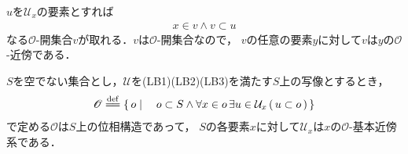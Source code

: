 \begin{description}
			\begin{sketch}
				$u$を$\mathcal{U}_{x}$の要素とすれば
				\begin{align}
					x \in v \wedge v \subset u
				\end{align}
				なる$\mathscr{O}$-開集合$v$が取れる．$v$は$\mathscr{O}$-開集合なので，
				$v$の任意の要素$y$に対して$v$は$y$の$\mathscr{O}$-近傍である．
				\QED
			\end{sketch}
	\end{description}
	
	\begin{screen}
		\begin{thm}[与えられたシステムを基本近傍系とする位相の生成]
		\label{thm:a_local_base_restores_the_topology}
			$S$を空でない集合とし，$\mathcal{U}$を(LB1)(LB2)(LB3)を満たす$S$上の写像とするとき，
			\begin{align}
				\mathscr{O} \defeq
				\Set{o}{o \subset S \wedge \forall x \in o\, \exists u \in \mathcal{U}_{x}\, (\, u \subset o\, )}
			\end{align}
			で定める$\mathscr{O}$は$S$上の位相構造であって，
			$S$の各要素$x$に対して$\mathcal{U}_{x}$は$x$の$\mathscr{O}$-基本近傍系である．
		\end{thm}
	\end{screen}
	
